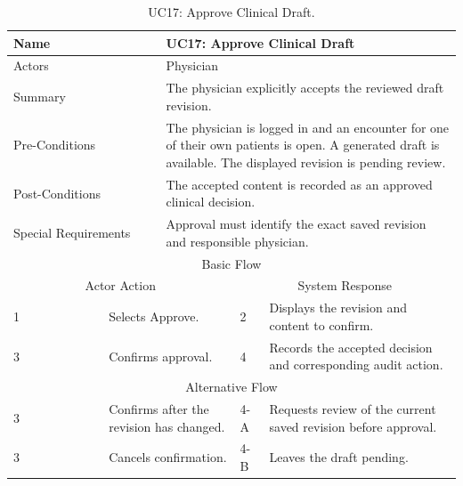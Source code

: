 \begin{table}[htbp]
\centering
\small
\caption{UC17: Approve Clinical Draft.}
\label{tab:kashaf:uc17}
\begin{tabular}{|p{}|p{}|p{}|p{}|p{}|}
\hline
\multicolumn{2}{|p{\dimexpr0.225\textwidth+2\tabcolsep+\arrayrulewidth\relax}|}{Name} & \multicolumn{3}{p{\dimexpr0.575\textwidth+4\tabcolsep+2\arrayrulewidth\relax}|}{UC17: Approve Clinical Draft} \\ \hline
\multicolumn{2}{|p{\dimexpr0.225\textwidth+2\tabcolsep+\arrayrulewidth\relax}|}{Actors} & \multicolumn{3}{p{\dimexpr0.575\textwidth+4\tabcolsep+2\arrayrulewidth\relax}|}{Physician} \\ \hline
\multicolumn{2}{|p{\dimexpr0.225\textwidth+2\tabcolsep+\arrayrulewidth\relax}|}{Summary} & \multicolumn{3}{p{\dimexpr0.575\textwidth+4\tabcolsep+2\arrayrulewidth\relax}|}{The physician explicitly accepts the reviewed draft revision.} \\ \hline
\multicolumn{2}{|p{\dimexpr0.225\textwidth+2\tabcolsep+\arrayrulewidth\relax}|}{Pre-Conditions} & \multicolumn{3}{p{\dimexpr0.575\textwidth+4\tabcolsep+2\arrayrulewidth\relax}|}{The physician is logged in and an encounter for one of their own patients is open. A generated draft is available. The displayed revision is pending review.} \\ \hline
\multicolumn{2}{|p{\dimexpr0.225\textwidth+2\tabcolsep+\arrayrulewidth\relax}|}{Post-Conditions} & \multicolumn{3}{p{\dimexpr0.575\textwidth+4\tabcolsep+2\arrayrulewidth\relax}|}{The accepted content is recorded as an approved clinical decision.} \\ \hline
\multicolumn{2}{|p{\dimexpr0.225\textwidth+2\tabcolsep+\arrayrulewidth\relax}|}{Special Requirements} & \multicolumn{3}{p{\dimexpr0.575\textwidth+4\tabcolsep+2\arrayrulewidth\relax}|}{Approval must identify the exact saved revision and responsible physician.} \\ \hline
\multicolumn{5}{|c|}{Basic Flow} \\ \hline
\multicolumn{3}{|c|}{Actor Action} & \multicolumn{2}{c|}{System Response} \\ \hline
1 & \multicolumn{2}{p{\dimexpr0.37\textwidth+2\tabcolsep+\arrayrulewidth\relax}|}{Selects Approve.} & 2 & Displays the revision and content to confirm. \\ \hline
3 & \multicolumn{2}{p{\dimexpr0.37\textwidth+2\tabcolsep+\arrayrulewidth\relax}|}{Confirms approval.} & 4 & Records the accepted decision and corresponding audit action. \\ \hline
\multicolumn{5}{|c|}{Alternative Flow} \\ \hline
3 & \multicolumn{2}{p{\dimexpr0.37\textwidth+2\tabcolsep+\arrayrulewidth\relax}|}{Confirms after the revision has changed.} & 4-A & Requests review of the current saved revision before approval. \\ \hline
3 & \multicolumn{2}{p{\dimexpr0.37\textwidth+2\tabcolsep+\arrayrulewidth\relax}|}{Cancels confirmation.} & 4-B & Leaves the draft pending. \\ \hline
\end{tabular}
\end{table}

